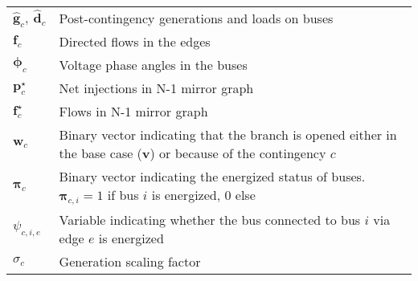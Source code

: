 \noindent
\begin{tabular}{p{1.5cm}p{6.5cm}}
    $\hat{\pmb{g}}_{c},\ \hat{\pmb{d}}_{c}$ & Post-contingency generations and loads on buses                                                                     \\
    $\pmb{f}_{c}$                           & Directed flows in the edges                                                                                          \\
    $\pmb{\phi}_{c}$                        & Voltage phase angles in the buses                                                                           \\
    $\pmb{p}^{\star}_{c}$                   & Net injections in N-1 mirror graph                                                                          \\
    $\pmb{f}^{\star}_{c}$                   & Flows in N-1 mirror graph                                                                                   \\
    $\pmb{w}_{c}$                           & Binary vector indicating that the branch is opened either in the base case ($\pmb{v}$) or because of the contingency $c$                                                                     \\
    $\pmb{\pi}_{c}$                         & Binary vector indicating the energized status of buses. $\pmb{\pi}_{c,i}=1$ if bus $i$ is energized, 0 else \\
    $\psi_{c,i,e}$                          & Variable indicating whether the bus connected to bus $i$ via edge $e$ is energized\\
    $\sigma_{c}$                            & Generation scaling factor
\end{tabular}

\medskip